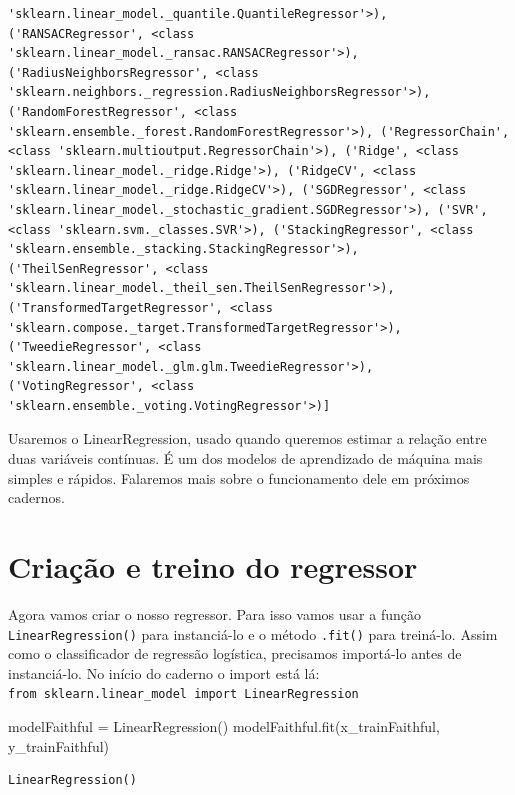 \documentclass[
  letterpaper,
  DIV=11,
  numbers=noendperiod]{scrreprt}
\newenvironment{Shaded}{\begin{snugshade}}{\end{snugshade}}
\newcommand{\NormalTok}[1]{\textcolor[rgb]{0.00,0.23,0.31}{#1}}
\newcommand{\OperatorTok}[1]{\textcolor[rgb]{0.37,0.37,0.37}{#1}}
\begin{document}
\begin{verbatim}
'sklearn.linear_model._quantile.QuantileRegressor'>), ('RANSACRegressor', <class 'sklearn.linear_model._ransac.RANSACRegressor'>), ('RadiusNeighborsRegressor', <class 'sklearn.neighbors._regression.RadiusNeighborsRegressor'>), ('RandomForestRegressor', <class 'sklearn.ensemble._forest.RandomForestRegressor'>), ('RegressorChain', <class 'sklearn.multioutput.RegressorChain'>), ('Ridge', <class 'sklearn.linear_model._ridge.Ridge'>), ('RidgeCV', <class 'sklearn.linear_model._ridge.RidgeCV'>), ('SGDRegressor', <class 'sklearn.linear_model._stochastic_gradient.SGDRegressor'>), ('SVR', <class 'sklearn.svm._classes.SVR'>), ('StackingRegressor', <class 'sklearn.ensemble._stacking.StackingRegressor'>), ('TheilSenRegressor', <class 'sklearn.linear_model._theil_sen.TheilSenRegressor'>), ('TransformedTargetRegressor', <class 'sklearn.compose._target.TransformedTargetRegressor'>), ('TweedieRegressor', <class 'sklearn.linear_model._glm.glm.TweedieRegressor'>), ('VotingRegressor', <class 'sklearn.ensemble._voting.VotingRegressor'>)]
\end{verbatim}

Usaremos o LinearRegression, usado quando queremos estimar a relação
entre duas variáveis contínuas. É um dos modelos de aprendizado de
máquina mais simples e rápidos. Falaremos mais sobre o funcionamento
dele em próximos cadernos.

\hypertarget{criauxe7uxe3o-e-treino-do-regressor}{%
\section{Criação e treino do
regressor}\label{criauxe7uxe3o-e-treino-do-regressor}}

Agora vamos criar o nosso regressor. Para isso vamos usar a função
\texttt{LinearRegression()} para instanciá-lo e o método \texttt{.fit()}
para treiná-lo. Assim como o classificador de regressão logística,
precisamos importá-lo antes de instanciá-lo. No início do caderno o
import está lá:
\texttt{from\ sklearn.linear\_model\ import\ LinearRegression}

\begin{Shaded}
\begin{Highlighting}[]
\NormalTok{modelFaithful }\OperatorTok{=}\NormalTok{ LinearRegression()}
\NormalTok{modelFaithful.fit(x\_trainFaithful, y\_trainFaithful)}
\end{Highlighting}
\end{Shaded}

\begin{verbatim}
LinearRegression()
\end{verbatim}
\end{document}
